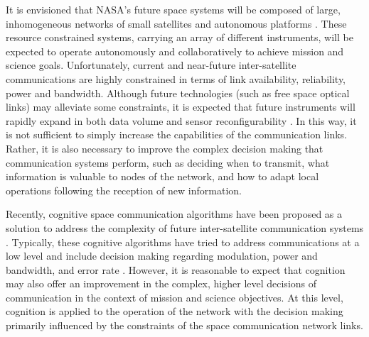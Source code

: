 \documentclass[conference]{IEEEtran}
\begin{document}
It is envisioned that NASA's future space systems will be composed of large,
inhomogeneous networks of small satellites and autonomous platforms \cite{ref1}.
These resource constrained systems, carrying an array of different instruments,
will be expected to operate autonomously and collaboratively to achieve mission
and science goals.  Unfortunately, current and near-future inter-satellite
communications are highly constrained in terms of link availability,
reliability, power and bandwidth.  Although future technologies (such as free
space optical links) may alleviate some constraints, it is expected that future
instruments will rapidly expand in both data volume and sensor reconfigurability
\cite{ref2}.  In this way, it is not sufficient to simply increase the
capabilities of the communication links.  Rather, it is also necessary to
improve the complex decision making that communication systems perform, such as
deciding when to transmit, what information is valuable to nodes of the network,
and how to adapt local operations following the reception of new information.

Recently, cognitive space communication algorithms have been proposed as a
solution to address the complexity of future inter-satellite communication
systems \cite{ref3}.  Typically, these cognitive algorithms have tried to
address communications at a low level and include decision making regarding
modulation, power and bandwidth, and error rate \cite{ref4,ref5}.  However, it
is reasonable to expect that cognition may also offer an improvement in the
complex, higher level decisions of communication in the context of mission and
science objectives.  At this level, cognition is applied to the operation of the
network with the decision making primarily influenced by the constraints of the
space communication network links.
\end{document}
